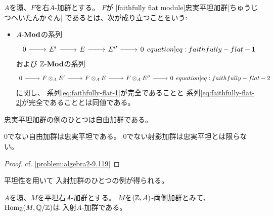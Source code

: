 \documentclass[report]{jlreq}
\begin{document}
\begin{definition}[忠実平坦加群]
    $A$を環、$F$を右$A$-加群とする。
    $F$が
    [faithfully flat module]{忠実平坦加群}[ちゅうじつへいたんかぐん]
    であるとは、次が成り立つことをいう:
    \begin{itemize}
        \item $A\text{-}\mathbf{Mod}$の系列
            \begin{equation}
                \begin{tikzcd}
                    0 \ar{r}
                        & E' \ar{r}
                        & E \ar{r}
                        & E'' \ar{r}
                        & 0
                \end{tikzcd}
                \label[equation]{eq:faithfully-flat-1}
            \end{equation}
            および
            $\mathbb{Z}\text{-}\mathbf{Mod}$の系列
            \begin{equation}
                \begin{tikzcd}
                    0 \ar{r}
                        & F \otimes_A E' \ar{r}
                        & F \otimes_A E \ar{r}
                        & F \otimes_A E'' \ar{r}
                        & 0
                \end{tikzcd}
                \label[equation]{eq:faithfully-flat-2}
            \end{equation}
            に関し、
            系列\cref{eq:faithfully-flat-1}が完全であることと
            系列\cref{eq:faithfully-flat-2}が完全であることとは同値である。
    \end{itemize}
\end{definition}

忠実平坦加群の例のひとつは自由加群である。

\begin{proposition}[自由加群は忠実平坦]
    $0$でない自由加群は忠実平坦である。
    $0$でない射影加群は忠実平坦とは限らない。
\end{proposition}

\begin{proof}
    cf. \cref{problem:algebra2-9.119}
\end{proof}

平坦性を用いて
入射加群のひとつの例が得られる。

\begin{proposition}
    $A$を環、$M$を平坦右$A$-加群とする。
    $M$を$(\mathbb{Z}, A)$-両側加群とみて、
    $\operatorname{Hom}_{\mathbb{Z}}(M, \mathbb{Q} / \mathbb{Z})$は
    入射$A$-加群である。
\end{proposition}
\end{document}
